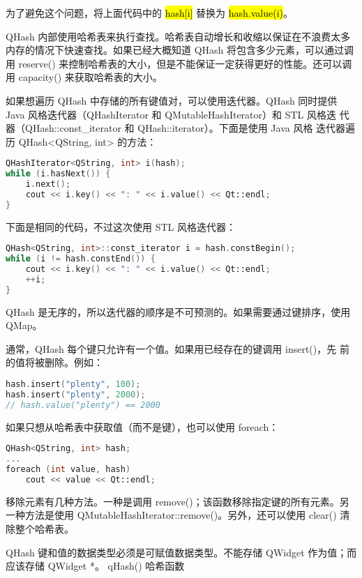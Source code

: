 为了避免这个问题，将上面代码中的 \hl{hash[i]} 替换为 \hl{hash.value(i)}。

QHash 内部使用哈希表来执行查找。哈希表自动增长和收缩以保证在不浪费太多内存的情况下快速查找。如果已经大概知道 QHash 将包含多少元素，可以通过调用 reserve() 来控制哈希表的大小，但是不能保证一定获得更好的性能。还可以调用 capacity() 来获取哈希表的大小。

如果想遍历 QHash 中存储的所有键值对，可以使用迭代器。QHash 同时提供
Java 风格迭代器（QHashIterator 和 QMutableHashIterator）和 STL 风格迭
代器（QHash::const\_iterator 和 QHash::iterator）。下面是使用 Java 风格
迭代器遍历 QHash<QString, int> 的方法：

\begin{lstlisting}[language=C++]
QHashIterator<QString, int> i(hash);
while (i.hasNext()) {
    i.next();
    cout << i.key() << ": " << i.value() << Qt::endl;
}
\end{lstlisting}

下面是相同的代码，不过这次使用 STL 风格迭代器：

\begin{lstlisting}[language=C++]
QHash<QString, int>::const_iterator i = hash.constBegin();
while (i != hash.constEnd()) {
    cout << i.key() << ": " << i.value() << Qt::endl;
    ++i;
}
\end{lstlisting}

QHash 是无序的，所以迭代器的顺序是不可预测的。如果需要通过键排序，使用 QMap。

通常，QHash 每个键只允许有一个值。如果用已经存在的键调用 insert()，先
前的值将被删除。例如：


\begin{lstlisting}[language=C++]
hash.insert("plenty", 100);
hash.insert("plenty", 2000);
// hash.value("plenty") == 2000
\end{lstlisting}

如果只想从哈希表中获取值（而不是键），也可以使用 foreach：

\begin{lstlisting}[language=C++]
QHash<QString, int> hash;
...
foreach (int value, hash)
    cout << value << Qt::endl;
\end{lstlisting}

移除元素有几种方法。一种是调用 remove()；该函数移除指定键的所有元素。另一种方法是使用 QMutableHashIterator::remove()。另外，还可以使用 clear() 清除整个哈希表。

QHash 键和值的数据类型必须是可赋值数据类型。不能存储 QWidget 作为值；而应该存储 QWidget *。
qHash() 哈希函数


